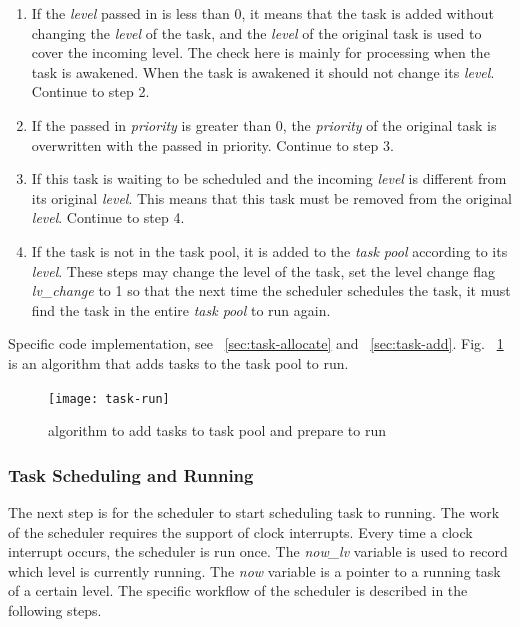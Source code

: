\documentclass{swfcthesis}
\begin{document}
\begin{enumerate}
\item If the \emph{level} passed in is less than 0, it means that the task is added without
  changing the \emph{level} of the task, and the \emph{level} of the original task is used
  to cover the incoming level. The check here is mainly for processing when the task is
  awakened. When the task is awakened it should not change its \emph{level}. Continue to
  step 2.
    
\item If the passed in \emph{priority} is greater than 0, the \emph{priority} of the
  original task is overwritten with the passed in priority. Continue to step 3.

\item If this task is waiting to be scheduled and the incoming \emph{level} is different from
  its original \emph{level}. This means that this task must be removed from the original
  \emph{level}. Continue to step 4.

\item If the task is not in the task pool, it is added to the \emph{task pool} according
  to its \emph{level}. These steps may change the level of the task, set the level change
  flag \emph{lv\_change} to 1 so that the next time the scheduler schedules the task, it
  must find the task in the entire \emph{task pool} to run again.
  
\end{enumerate}
Specific code implementation, see ~\ref{sec:task-allocate} and
~\ref{sec:task-add}. Fig. ~\ref{fig:algo-add} is an algorithm that adds tasks to the task
pool to run.


\begin{figure}[!ht]
  \centering
  \texttt{[image: task-run]}
  \caption{algorithm to add tasks to task pool and prepare to run}
  \label{fig:algo-add}
\end{figure}

\subsubsection{Task Scheduling and Running}
\label{sec:task-sched-runn}


The next step is for the scheduler to start scheduling task to running. The work of the
scheduler requires the support of clock interrupts. Every time a clock interrupt occurs,
the scheduler is run once. The \emph{now\_lv} variable is used to record which level is
currently running. The \emph{now} variable is a pointer to a running task of a certain
level. The specific workflow of the scheduler is described in the following steps. 
\end{document}
